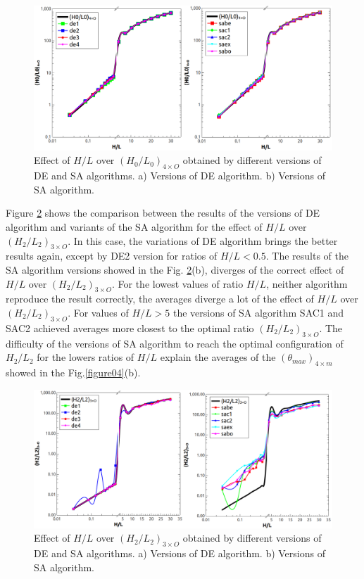 \documentclass[12pt,fleqn]{article}
\begin{document}
\begin{figure}[H]
\centering
\includegraphics[width=0.9\linewidth]{imgs/5dof/de_sa_hl_h0l0.png}
\caption{ {\small Effect of $H/L$ over ${(H_{0}/L_{0})_{4\times O}}$ obtained by different versions of DE and SA algorithms.  a) Versions of DE algorithm. b) Versions of SA algorithm.}}
\label{figure05}
\end{figure}
Figure \ref{figure06} shows the comparison between the results of the versions of DE algorithm and variants of the SA algorithm for the effect of $H/L$ over ${(H_{2}/L_{2})_{3\times O}}$. In this case, the variations of DE algorithm brings the better results again, except by DE2 version for ratios of $H/L< 0.5$. The results of the SA algorithm versions showed in the Fig. \ref{figure06}(b), diverges of the correct effect of $H/L$ over ${(H_{2}/L_{2})_{3\times O}}$. For the lowest values of ratio $H/L$, neither algorithm reproduce the result correctly, the averages diverge a lot of the effect of $H/L$ over ${(H_{2}/L_{2})_{3\times O}}$. For values of $H/L > 5$ the versions of SA algorithm SAC1 and SAC2 achieved averages more closest to the optimal ratio ${(H_{2}/L_{2})_{3\times O}}$. The difficulty of the versions of SA algorithm to reach the optimal configuration of $H_{2}/L_{2}$ for the lowers ratios of $H/L$ explain the averages of the $({\theta}_{max})_{4\times m}$ showed in the Fig.\ref{figure04}(b).


\begin{figure}[H]
\centering
\includegraphics[width=0.9\linewidth]{imgs/5dof/de_sa_hl_h2l2.png}
\caption{ {\small Effect of $H/L$ over ${(H_{2}/L_{2})_{3\times O}}$ obtained by different versions of DE and SA algorithms. a) Versions of DE algorithm. b) Versions of SA algorithm.}}
\label{figure06}
\end{figure}
\end{document}
